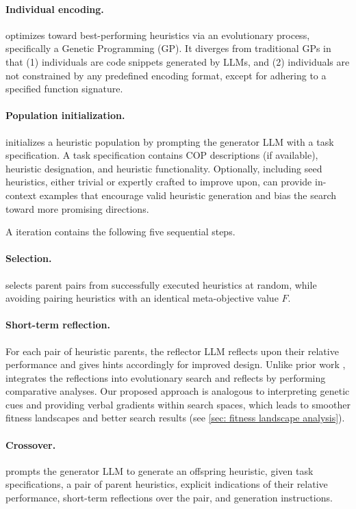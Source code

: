 \paragraph*{Individual encoding. }\our{} optimizes toward best-performing heuristics via an evolutionary process, specifically a Genetic Programming (GP). It diverges from traditional GPs in that (1) individuals are code snippets generated by LLMs, and (2) individuals are not constrained by any predefined encoding format, except for adhering to a specified function signature.


\paragraph*{Population initialization. }\our{} initializes a heuristic population by prompting the generator LLM with a task specification. A task specification contains COP descriptions (if available), heuristic designation, and heuristic functionality. Optionally, including seed heuristics, either trivial or expertly crafted to improve upon, can provide in-context examples that encourage valid heuristic generation and bias the search toward more promising directions.

A \our{} iteration contains the following five sequential steps.

\paragraph*{Selection. }\our{} selects parent pairs from successfully executed heuristics at random, while avoiding pairing heuristics with an identical meta-objective value \(F\). 

\paragraph*{Short-term reflection. } For each pair of heuristic parents, the reflector LLM reflects upon their relative performance and gives hints accordingly for improved design.
Unlike prior work \cite{shinn2023reflexion}, \our{} integrates the reflections into evolutionary search and reflects by performing comparative analyses. Our proposed approach is analogous to interpreting genetic cues and providing verbal gradients within search spaces, which leads to smoother fitness landscapes and better search results (see \cref{sec: fitness landscape analysis}).

\paragraph*{Crossover. }\our{} prompts the generator LLM to generate an offspring heuristic, given task specifications, a pair of parent heuristics, explicit indications of their relative performance, short-term reflections over the pair, and generation instructions.

